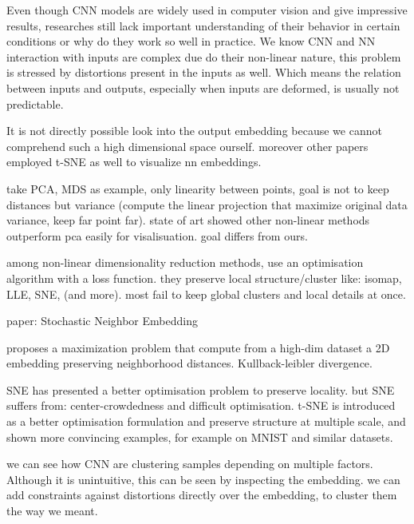 \documentclass[a4paper,12pt]{report}
\begin{document}
Even though CNN models are widely used in computer vision and give impressive results, researches still lack important understanding of their behavior in certain conditions\cite{szegedy2013intriguing} or why do they work so well in practice. %
We know CNN and NN interaction with inputs are complex due do their non-linear nature, this problem is stressed by distortions present in the inputs as well.
Which means the relation between inputs and outputs, especially when inputs are deformed, is usually not predictable.



It is not directly possible look into the output embedding because we cannot comprehend such a high dimensional space ourself.
moreover other papers employed t-SNE as well to visualize nn embeddings.

take PCA, MDS as example, only linearity between points, goal is not to keep distances but variance (compute the linear projection that maximize original data variance, keep far point far).
state of art showed other non-linear methods outperform pca easily for visalisuation.
goal differs from ours.

among non-linear dimensionality reduction methods, use an optimisation algorithm with a loss function.
they preserve local structure/cluster like: isomap, LLE, SNE, (and more).
most fail to keep global clusters and local details at once.

paper: Stochastic Neighbor Embedding

proposes a maximization problem that compute from a high-dim dataset a 2D embedding preserving neighborhood distances.
Kullback-leibler divergence.

SNE has presented a better optimisation problem to preserve locality\cite{SNE}.
but SNE suffers from: center-crowdedness and difficult optimisation.
t-SNE is introduced as a better optimisation formulation and preserve structure at multiple scale, and shown more convincing examples, for example on MNIST\cite{t-SNE} and similar datasets\cite{van2009new}.

we can see how CNN are clustering samples depending on multiple factors.
Although it is unintuitive, this can be seen by inspecting the embedding.
we can add constraints against distortions directly over the embedding, to cluster them the way we meant.
\end{document}
